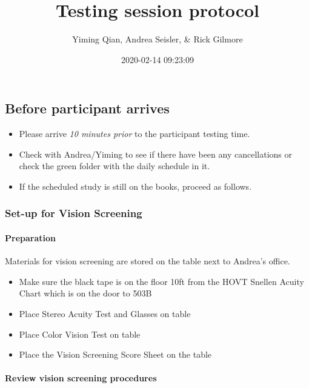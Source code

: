\documentclass[]{article}
\title{Testing session protocol}
\author{Yiming Qian, Andrea Seisler, \& Rick Gilmore}
\date{2020-02-14 09:23:09}
\providecommand{\tightlist}{%
  \setlength{\itemsep}{0pt}\setlength{\parskip}{0pt}}
\let\oldparagraph\paragraph
\renewcommand{\paragraph}[1]{\oldparagraph{#1}\mbox{}}
\begin{document}
\maketitle

{
\setcounter{tocdepth}{3}
\tableofcontents
}
\hypertarget{before-participant-arrives}{%
\subsection{Before participant
arrives}\label{before-participant-arrives}}

\begin{itemize}
\tightlist
\item
  Please arrive \emph{10 minutes prior} to the participant testing time.
\item
  Check with Andrea/Yiming to see if there have been any cancellations
  or check the green folder with the daily schedule in it.
\item
  If the scheduled study is still on the books, proceed as follows.
\end{itemize}

\hypertarget{set-up-for-vision-screening}{%
\subsubsection{Set-up for Vision
Screening}\label{set-up-for-vision-screening}}

\hypertarget{preparation}{%
\paragraph{Preparation}\label{preparation}}

Materials for vision screening are stored on the table next to Andrea's
office.

\begin{itemize}
\tightlist
\item
  Make sure the black tape is on the floor 10ft from the HOVT Snellen
  Acuity Chart which is on the door to 503B
\item
  Place Stereo Acuity Test and Glasses on table
\item
  Place Color Vision Test on table
\item
  Place the Vision Screening Score Sheet on the table
\end{itemize}

\hypertarget{review-vision-screening-procedures}{%
\paragraph{Review vision screening
procedures}\label{review-vision-screening-procedures}}
\end{document}
